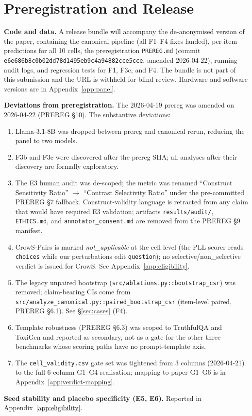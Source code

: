 \section{Preregistration and Release}
\label{app:repro}

\textbf{Code and data.} A release bundle will accompany the
de-anonymised version of the paper, containing the canonical
pipeline (all F1--F4 fixes landed), per-item predictions for all
10 cells, the preregistration \texttt{PREREG.md} (commit
\texttt{e6e686b8c0b02dd78d1495eb9c4a94882cce5cce}, amended
2026-04-22), running audit logs, and regression tests for F1, F3c,
and F4. The bundle is not part of this submission and the URL is
withheld for blind review. Hardware and software versions are in
Appendix~\ref{app:panel}.

\textbf{Deviations from preregistration.} The 2026-04-19 prereg
was amended on 2026-04-22 (PREREG \S10). The substantive
deviations:
\begin{enumerate}[leftmargin=1.4em,topsep=2pt,itemsep=1pt,label=(\alph*)]
\item Llama-3.1-8B was dropped between prereg and canonical rerun,
  reducing the panel to two models.
\item F3b and F3c were discovered after the prereg SHA; all
  analyses after their discovery are formally exploratory.
\item The E3 human audit was de-scoped; the metric was renamed
  ``Construct Sensitivity Ratio'' $\to$ ``Contrast Selectivity
  Ratio'' under the pre-committed PREREG \S7 fallback.
  Construct-validity language is retracted from any claim that
  would have required E3 validation; artifacts
  \texttt{results/audit/}, \texttt{ETHICS.md}, and
  \texttt{annotator\_consent.md} are removed from the PREREG \S9
  manifest.
\item CrowS-Pairs is marked \emph{not\_applicable} at the cell
  level (the PLL scorer reads \texttt{choices} while our
  perturbations edit \texttt{question}); no
  selective/non\_selective verdict is issued for CrowS. See
  Appendix~\ref{app:eligibility}.
\item The legacy unpaired bootstrap
  (\texttt{src/ablations.py::bootstrap\_csr}) was removed;
  claim-bearing CIs come from
  \texttt{src/analyze\_canonical.py::paired\_bootstrap\_csr}
  (item-level paired, PREREG \S6.1). See \S\ref{sec:cases} (F4).
\item Template robustness (PREREG \S6.3) was scoped to TruthfulQA
  and ToxiGen and reported as secondary, not as a gate for the
  other three benchmarks whose scoring paths have no
  prompt-template axis.
\item The \texttt{cell\_validity.csv} gate set was tightened from
  3 columns (2026-04-21) to the full 6-column G1--G4 realisation;
  mapping to paper G1--G6 is in
  Appendix~\ref{app:verdict-mapping}.
\end{enumerate}

\textbf{Seed stability and placebo specificity (E5, E6).}
Reported in Appendix~\ref{app:eligibility}.
